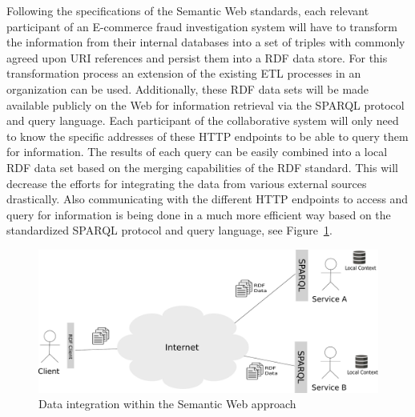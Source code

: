 Following the specifications of the Semantic Web standards, each relevant participant of an \gls{E-commerce} fraud investigation system will have to transform the information from their internal databases into a set of triples with commonly agreed upon \gls{URI} references and persist them into a \gls{RDF} data store. For this transformation process an extension of the existing \gls{ETL} processes in an organization can be used. Additionally, these \gls{RDF} data sets will be made available publicly on the Web for information retrieval via the \gls{SPARQL} protocol and query language. Each participant of the collaborative system will only need to know the specific addresses of these \gls{HTTP} endpoints to be able to query them for information. The results of each query can be easily combined into a local \gls{RDF} data set based on the merging capabilities of the \gls{RDF} standard. This will decrease the efforts for integrating the data from various external sources drastically. Also communicating with the different \gls{HTTP} endpoints to access and query for information is being done in a much more efficient way based on the standardized \gls{SPARQL} protocol and query language, see Figure~\ref{fig:web_data_scenario}. \@

\begin{figure}[H]
  \centering
  \includegraphics[width=0.9\columnwidth]{images/web-data-scenario.pdf}
  \caption{Data integration within the Semantic Web approach}
\label{fig:web_data_scenario}
\end{figure}

